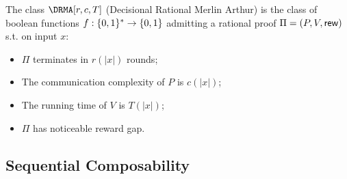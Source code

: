 \begin{definition}
The class $\DRMA[r, c, T]$ (Decisional Rational Merlin Arthur)
is the class of boolean functions $f : \{0, 1\}^{*} \to \{0, 1\}$ admitting a rational proof $\Pi = (P,V, \mathsf{rew})$ s.t. on input $x$:
\begin{itemize}
    \item $\Pi$ terminates in $r(|x|)$ rounds;
    \item The communication complexity of $P$ is $c(|x|)$;
    \item The running time of $V$ is $T(|x|)$;
    \item $\Pi$ has noticeable reward gap.
\end{itemize}
\end{definition}


\begin{comment}
A composition theorem (in its weak version: for yes/no Rational Proofs):
\begin{theorem}
Let $\protOne = (P_1, V_1^{L_2})$ be a (yes/no) rational proof for language $L_1$ with noticeable reward gap and let $V^{L_2}$ have oracle access to language $L_2$ with at most $O(1)$ queries.
Let $\protTwo (P_2, V_2)$ be a (yes/no) rational proof for $L_2$ with noticeable reward gap.
Then there exists a (yes/no) rational proof $\pi$ for $L_1$ with noticeable reward gap.
Moreover if $\protOne$ and $\protTwo$ have round, communication and verification complexity respectively $r_1(n), cc_1(n), T_1(n)$  and $r_2(n), cc_2(n), T_2(n)$ then language $L_1 \in DRMA[r_1(n) + O(r_2(n)), cc_1(n) + O(cc_2(n)), T_1(n) + O(T_2(n))]$
\end{theorem}
\end{comment}




\subsection{Sequential Composability}
